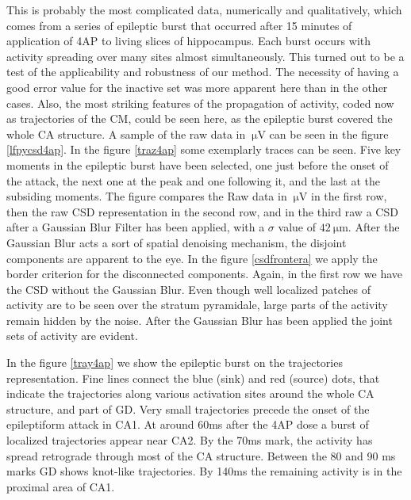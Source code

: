 \documentclass[11pt, letterpaper]{article}
\newcommand{\mum}[1]{\SI{#1}{\micro\metre}}
\newcommand{\muV}[1]{\SI{#1}{\micro\volt}}
\begin{document}
This is probably the most complicated data, 
numerically and qualitatively, which comes from a series of epileptic burst
that occurred after 15 minutes of application of 4AP to living slices of
hippocampus. Each burst occurs with activity spreading over many sites almost
simultaneously. This turned out to be a test of the applicability and
robustness of our method.
The necessity of having a good error value for the inactive set was more apparent here
than in the other cases. Also, the most striking features of the propagation of activity,
coded now as trajectories of the CM, could be seen here, as the epileptic burst covered the whole
CA structure. A sample of the raw data in $\muV{}$ can be seen in the figure \ref{lfpycsd4ap}. In the figure \ref{traz4ap} some exemplarly traces
can be seen.
Five key moments in the epileptic burst have been selected, one just before the onset of the attack, the next one at the peak and one  following it, and the last at the subsiding moments. The figure compares the Raw data
in $\muV{}$ in the first row, then the raw CSD representation in the second row, and
in the third raw a CSD after a Gaussian Blur Filter has been applied,
with a $\sigma$ value of $ \mum{42}$. After the Gaussian Blur acts a sort of
spatial denoising mechanism, the disjoint components are apparent to the eye.
In the figure \ref{csdfrontera} we apply the border criterion for the disconnected
components. Again, in the first row we have the CSD without the Gaussian Blur.
Even though well localized patches of activity are to be seen over the
stratum pyramidale, large parts of the activity remain hidden by the noise.
After the Gaussian Blur has been applied the joint sets of activity are evident. 

In the figure \ref{tray4ap} we show the epileptic burst on the trajectories representation.
Fine lines
connect the blue (sink) and red (source) dots, that indicate the trajectories
along various activation
sites around the whole CA structure, and part of GD. Very small trajectories precede
the onset of the epileptiform attack in CA1. At around 60ms after the 4AP dose a burst
of localized trajectories appear near CA2. By the 70ms mark, the activity has spread
retrograde through most of the CA structure. Between the 80 and 90 ms marks
GD shows knot-like trajectories. By 140ms the remaining activity is in the proximal
area of CA1.
\end{document}
